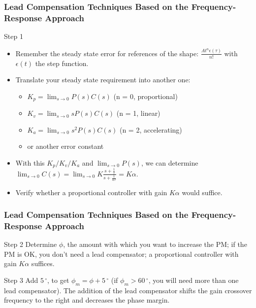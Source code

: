 \begin{frame}
	\frametitle{Lead Compensation Techniques Based on the Frequency-Response Approach}
	\begin{block}{Step 1}
		\begin{itemize}
			\item Remember the steady state error for references of the shape: $\frac{At^n\epsilon(\tau)}{n!}$ with $\epsilon(t)$ the step function.
			\item Translate your steady state requirement into another one:
			\begin{itemize}
				\item $K_p = \lim_{s \to 0} P(s)C(s)$ (n = 0, proportional)
				\item $K_v = \lim_{s \to 0} sP(s)C(s)$ (n = 1, linear)
				\item $K_a = \lim_{s \to 0} s^2P(s)C(s)$ (n = 2, accelerating)
				\item or another error constant
			\end{itemize}
			\item With this $K_p/K_v/K_a$ and $\lim_{s \to 0} P(s)$, we can determine $\lim_{s \to 0}C(s) = \lim_{s \to 0} K\frac{s + \frac{1}{\tau}}{s + \frac{1}{\alpha\tau}} = K\alpha$.
			\item Verify whether a proportional controller with gain $K\alpha$ would suffice.
		\end{itemize}
	\end{block}
\end{frame}

\begin{frame}
	\frametitle{Lead Compensation Techniques Based on the Frequency-Response Approach}
	\begin{block}{Step 2}
		Determine $\phi$, the amount with which you want to increase the PM; if the PM is OK, you don’t need a lead compensator; a proportional controller with gain $K\alpha$ suffices.
	\end{block}
	\begin{block}{Step 3}
		Add $5\,^{\circ}$, to get $\phi_m = \phi + 5\,^{\circ}$ (if $\phi_m > 60\,^{\circ}$, you will need more than one lead compensator). The addition of the lead compensator shifts the gain crossover frequency to the right and decreases the
		phase margin.
	\end{block}
\end{frame}

